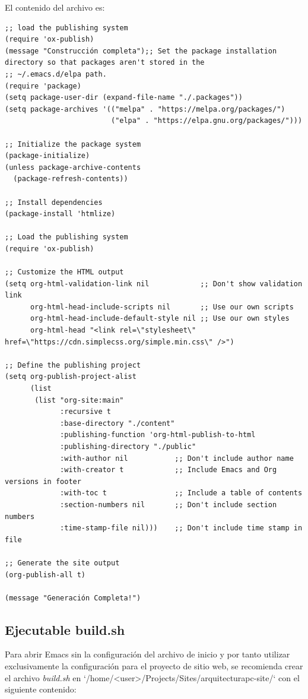 \documentclass{article}
\begin{document}
El contenido del archivo es:
\begin{verbatim}
;; load the publishing system
(require 'ox-publish)
(message "Construcción completa");; Set the package installation directory so that packages aren't stored in the
;; ~/.emacs.d/elpa path.
(require 'package)
(setq package-user-dir (expand-file-name "./.packages"))
(setq package-archives '(("melpa" . "https://melpa.org/packages/")
                         ("elpa" . "https://elpa.gnu.org/packages/")))

;; Initialize the package system
(package-initialize)
(unless package-archive-contents
  (package-refresh-contents))

;; Install dependencies
(package-install 'htmlize)

;; Load the publishing system
(require 'ox-publish)

;; Customize the HTML output
(setq org-html-validation-link nil            ;; Don't show validation link
      org-html-head-include-scripts nil       ;; Use our own scripts
      org-html-head-include-default-style nil ;; Use our own styles
      org-html-head "<link rel=\"stylesheet\" href=\"https://cdn.simplecss.org/simple.min.css\" />")

;; Define the publishing project
(setq org-publish-project-alist
      (list
       (list "org-site:main"
             :recursive t
             :base-directory "./content"
             :publishing-function 'org-html-publish-to-html
             :publishing-directory "./public"
             :with-author nil           ;; Don't include author name
             :with-creator t            ;; Include Emacs and Org versions in footer
             :with-toc t                ;; Include a table of contents
             :section-numbers nil       ;; Don't include section numbers
             :time-stamp-file nil)))    ;; Don't include time stamp in file

;; Generate the site output
(org-publish-all t)

(message "Generación Completa!")
\end{verbatim}
\subsection{Ejecutable build.sh}
\label{sec:org871b226}
Para abrir Emacs sin la configuración del archivo de inicio y por
tanto utilizar exclusivamente la configuración para el proyecto de
sitio web, se recomienda crear el archivo \emph{build.sh} en
`/home/<user>/Projects/Sites/arquitecturapc-site/` con el siguiente
contenido:
\end{document}
